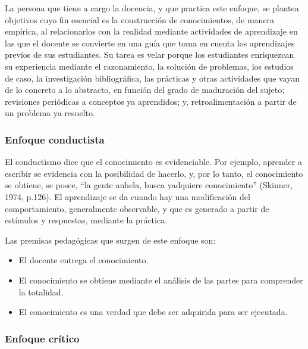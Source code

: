 La persona que tiene a cargo la docencia, y que practica este enfoque, se plantea objetivos cuyo fin esencial es la construcción de conocimientos, de manera empírica, al relacionarlos con la realidad mediante actividades de aprendizaje en las que el docente se convierte en una guía que toma en cuenta los aprendizajes previos de sus estudiantes. Su tarea es velar porque los estudiantes enriquezcan su experiencia mediante el razonamiento, la solución de problemas, los estudios de caso, la investigación bibliográfica, las prácticas y otras actividades que vayan de lo concreto a lo abstracto, en función del grado de maduración del sujeto; revisiones periódicas a conceptos ya aprendidos; y, retroalimentación a partir de un problema ya resuelto. 

\subsubsection*{Enfoque conductista}

El conductismo dice que el conocimiento es evidenciable. Por ejemplo, aprender a escribir se evidencia con la posibilidad de hacerlo, y, por lo tanto, el conocimiento se obtiene, se posee, “la gente anhela, busca yadquiere conocimiento” (Skinner, 1974, p.126). El aprendizaje se da cuando hay una modificación del comportamiento, generalmente observable, y que es generado a partir de estímulos y respuestas, mediante la práctica.

Las premisas pedagógicas que surgen de este enfoque son: 


\begin{itemize}
    
    \color{blue} \item \color{black} El docente entrega el conocimiento. 


    
     \color{blue} \item \color{black} El conocimiento se obtiene mediante el análisis de las partes para comprender la totalidad. 
     
    \color{blue} \item \color{black} El conocimiento es una verdad que debe ser adquirida para ser ejecutada. 
    \end{itemize}


\subsubsection*{Enfoque crítico}

